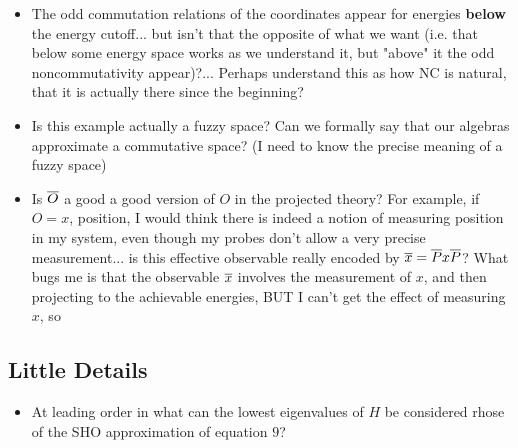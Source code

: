     \begin{itemize}
        
    \item The odd commutation relations of the coordinates appear for energies \textbf{below} the energy cutoff... but isn't that the opposite of what we want (i.e. that below some energy space works as we understand it, but "above" it the odd noncommutativity appear)?... Perhaps understand this as how NC is natural, that it is actually there since the beginning?
    
    \item Is this example actually a fuzzy space? Can we formally say that our algebras approximate a commutative space? (I need to know the precise meaning of a fuzzy space)
        
    \item Is $\overline{O}$ a good a good version of $O$ in the projected theory? For example, if $O = x$, position, I would think there is indeed a notion of measuring position in my system, even though my probes don't allow a very precise measurement... is this effective observable really encoded by $\overline{x} =\overline{P} x \overline{P}$? {\tiny What bugs me is that the observable $\overline{x}$ involves the measurement of $x$, and then projecting to the achievable energies, BUT I can't get the effect of measuring $x$, so }    
    
    \end{itemize}


\subsection{Little Details}

    \begin{itemize}
    
    \item At leading order in what can the lowest eigenvalues of $H$ be considered rhose of the SHO approximation of equation $9$?
        
    \end{itemize}